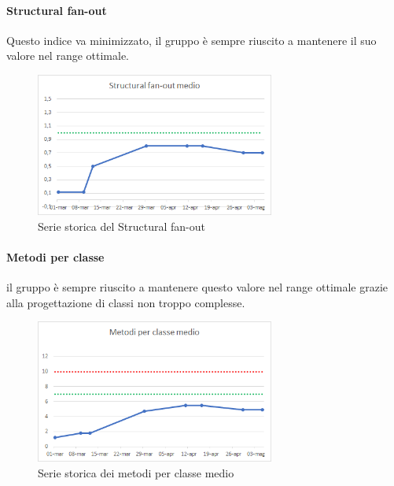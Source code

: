     \paragraph{Structural fan-out} \Spazio
    Questo indice va minimizzato, il gruppo è sempre riuscito a mantenere il suo valore nel range ottimale.
    \begin{figure}[H]
    	\centering 
    	\includegraphics[width=0.7\textwidth]{Images/SFOUT.png}
    	\caption{Serie storica del Structural fan-out}
    	\label{SFOUT} 
    \end{figure}
    \paragraph{Metodi per classe} \Spazio
    il gruppo è sempre riuscito a mantenere questo valore nel range ottimale grazie alla progettazione di classi non troppo complesse.
    \begin{figure}[H]
    	\centering 
    	\includegraphics[width=0.7\textwidth]{Images/metodi.png}
    	\caption{Serie storica dei metodi per classe medio}
    	\label{metodi} 
    \end{figure}

